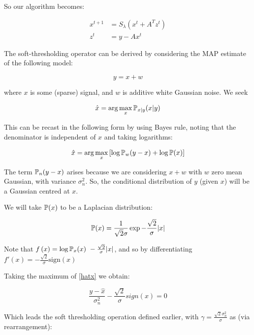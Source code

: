 \documentclass{article}
\begin{document}
So our algorithm becomes:

\begin{align*}
x^{t+1} &= S_{\lambda}\left(x^t + A^Tz^t\right) \\
z^t &= y - Ax^t
\end{align*}

The soft-thresholding operator can be derived by considering the MAP estimate of the following model:

\begin{equation}
y = x + w
\end{equation}

where \(x\) is some (sparse) signal, and \(w\) is additive white Gaussian noise. We seek

\begin{equation}
\hat{x} = \arg\max_x {\mathbb{P}}_{x|y}{\left(x|y\right)}
\end{equation}

This can be recast in the following form by using Bayes rule, noting that the denominator is independent of \(x\) and taking logarithms:

\begin{equation}
\hat{x} = \arg\max_x \left[\log{{\mathbb{P}}_{w}{\left(y-x\right)}}+\log{{\mathbb{P}}{\left(x\right)}}\right]
\label{hatx}
\end{equation}

The term \({\mathbb{P}}_{n}{\left(y-x\right)}\) arises because we are considering \(x+w\) with \(w\) zero mean Gaussian, with variance \(\sigma_n^2\). So, the conditional distribution of \(y\) (given \(x\)) will be a Gaussian centred at \(x\).

We will take \({\mathbb{P}}{\left(x\right)}\) to be a Laplacian distribution:

\begin{equation}
{\mathbb{P}}{\left(x\right)} = \frac{1}{\sqrt{2}\sigma}\exp{-\frac{\sqrt{2}}{\sigma}|x|}
\end{equation}

Note that \( f\left(x\right) = \log{{\mathbb{P}}_x{ \left( x \right)}} ~ -\frac{\sqrt{2}}{\sigma} |x| \), and so by differentiating \( f'\left(x\right) = -\frac{\sqrt{2}}{\sigma} \mathrm{sign}\left(x\right) \)

Taking the maximum of \ref{hatx} we obtain:

\begin{equation}
\frac{y-\hat{x}}{\sigma^2_n}-\frac{\sqrt{2}}{\sigma}sign(x) = 0
\end{equation}

Which leads the soft thresholding operation defined earlier, with \(\gamma = \frac{\sqrt{2}\sigma^2_n}{\sigma}\) as (via rearrangement):
\end{document}
